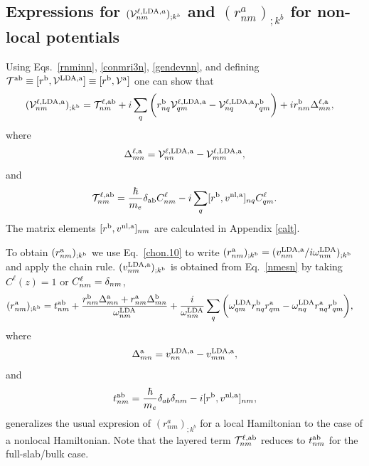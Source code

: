 \documentclass[floatfix,prb,aps,superscriptaddress,11pt,preprint,letterpaper]{revtex4}
\begin{document}
\subsection{Expressions for 
\texorpdfstring{$({\mathbf{\cal V}}^{\ell,\mathrm{LDA},a}_{nm})_{;k^b}$}{Vnonlocal}
and \texorpdfstring{$(r^a_{nm})_{;k^b}$}{Vnonlocal}
for non-local potentials}\label{appvnl}

Using Eqs.~\eqref{rnminn}, \eqref{conmri3n}, \eqref{gendevnn}, and
defining 
$
{\cal T}^{\mathrm{a}\mathrm{b}}\equiv[r^{\mathrm{b}},{\mathbf{\cal V}}^{\mathrm{LDA},\mathrm{a}}]
\equiv
[r^{\mathrm{b}},{\mathbf{\cal V}}^{\mathrm{a}}]
$
one can show that{\color{red} 
\begin{align}\label{nmesn}
({\mathbf{\cal V}}^{\ell,\mathrm{LDA},\mathrm{a}}_{nm})_{;k^{\mathrm{b}}}&=
{\cal T}_{nm}^{\ell,\mathrm{a}\mathrm{b}}
+i
\sum_{q}
\bigg(
r^{\mathrm{b}}_{nq}  
{\mathbf{\cal V}}^{\ell,\mathrm{LDA},\mathrm{a}}_{q m}
-
{\mathbf{\cal V}}^{\ell,\mathrm{LDA},\mathrm{a}}_{nq}   
r^{\mathrm{b}}_{q m}
\bigg)  
+i  
r^{\mathrm{b}}_{nm}
\Delta^{\ell,\mathrm{a}}_{mn}
,
\end{align}}
where
\begin{eqnarray}\label{tdel}
\Delta^{\ell,\mathrm{a}}_{mn}
=
{\mathbf{\cal V}}^{\ell,\mathrm{LDA},\mathrm{a}}_{nn}  
-
{\mathbf{\cal V}}^{\ell,\mathrm{LDA},\mathrm{a}}_{mm}  
,
\end{eqnarray} 
and
\begin{align}\label{tau.1}
{\cal T}_{nm}^{\ell,\mathrm{a}\mathrm{b}}
=
\frac{\hbar}{m_e}\delta_{\mathrm{a}\mathrm{b}}
C^\ell_{nm} 
-i 
\sum_q 
[r^{\mathrm{b}},v^{\mathrm{nl},\mathrm{a}}]_{nq}C^\ell_{qm} 
.
\end{align}  
The matrix elements $[r^{\mathrm{b}},v^{\mathrm{nl},\mathrm{a}}]_{nm}$
are calculated in Appendix \ref{calt}.

To obtain $(r^{\mathrm{a}}_{nm})_{;k^{\mathrm{b}}}$ we use Eq.~\eqref{chon.10} to
write
$(r^{\mathrm{a}}_{nm})_{;k^{\mathrm{b}}}
=(v^{\mathrm{LDA},\mathrm{a}}_{nm}/i\omega^{\mathrm{LDA}}_{nm})_{;k^{\mathrm{b}}}
$ {\color{red} and} apply the chain rule. 
{\color{red} 
$(v^{\mathrm{LDA},\mathrm{a}}_{nm})_{;k^{\mathrm{b}}}$} is obtained
from Eq.~\eqref{nmesn} by
taking
{\color{red} $C^\ell(z)=1$ or $C^\ell_{nm}=\delta_{nm}$,}
\begin{align}\label{na_rgendevn}
(r^{\mathrm{a}}_{nm})_{;k^{\mathrm{b}}}
&=
t^{\mathrm{a}\mathrm{b}}_{nm}
+
\frac{ 
r^{\mathrm{b}}_{nm}
\Delta^{\mathrm{a}}_{mn}
+r^{\mathrm{a}}_{nm}
\Delta^{\mathrm{b}}_{mn}
}
{\omega^{\mathrm{LDA}}_{nm}}
+
\frac{i}{\omega^{\mathrm{LDA}}_{nm}}
\sum_{q}
\bigg(
\omega^{\mathrm{LDA}}_{q m} 
r^{\mathrm{b}}_{nq} 
r^{\mathrm{a}}_{q m}
-
\omega^{\mathrm{LDA}}_{nq} 
r^{\mathrm{a}}_{nq} 
r^{\mathrm{b}}_{q m}
\bigg)
,
\end{align} 
where 
\begin{eqnarray}\label{del}
\Delta^{\mathrm{a}}_{mn}
=
v^{\mathrm{LDA},\mathrm{a}}_{nn}  
-
v^{\mathrm{LDA},\mathrm{a}}_{mm}  
,
\end{eqnarray}
and{\color{red} 
\begin{align}\label{tau.1n} 
t_{nm}^{\mathrm{a}\mathrm{b}}
=\frac{\hbar}{m_e}\delta_{ab}\delta_{nm} 
-i [r^{\mathrm{b}},v^{\mathrm{nl},\mathrm{a}}]_{nm} 
,
\end{align}}
generalizes the usual expresion of
$(r^a_{nm})_{;k^b}$ for {\color{red} a} local 
{\color{red} Hamiltonian}
\cite{aversaPRB95,nastosPRB05,cabellosPRB09,rashkeevPRB98}
to
the case of a
nonlocal Hamiltonian.
Note that the layered term
${\cal T}^{\ell,\mathrm{a}\mathrm{b}}_{nm}$ reduces to $t^{\mathrm{a}\mathrm{b}}_{nm}$
{\color{red} for the full-slab/bulk case.}
\end{document}

